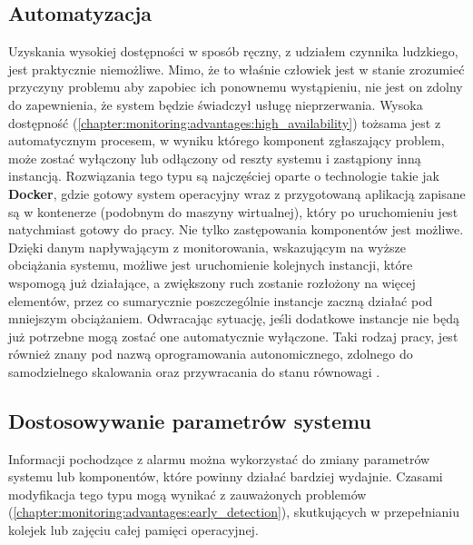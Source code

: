     \subsection{Automatyzacja}
    Uzyskania wysokiej dostępności w sposób ręczny, z udziałem czynnika ludzkiego, jest praktycznie niemożliwe.
    Mimo, że to właśnie człowiek jest w stanie zrozumieć przyczyny problemu aby zapobiec ich ponownemu wystąpieniu, 
    nie jest on zdolny do zapewnienia, że system będzie świadczył usługę nieprzerwania. Wysoka dostępność (\ref{chapter:monitoring:advantages:high_availability}) tożsama jest z automatycznym procesem, w wyniku którego
    komponent zgłaszający problem, może zostać wyłączony lub odłączony od reszty systemu i zastąpiony inną instancją.
    Rozwiązania tego typu są najczęściej oparte o technologie takie jak \textbf{Docker}, gdzie gotowy system
    operacyjny wraz z przygotowaną aplikacją zapisane są w kontenerze (podobnym do maszyny wirtualnej), który po 
    uruchomieniu jest natychmiast gotowy do pracy. Nie tylko zastępowania komponentów jest możliwe. Dzięki
    danym napływającym z monitorowania, wskazującym na wyższe obciążania systemu, możliwe jest uruchomienie
    kolejnych instancji, które wspomogą już działające, a zwiększony ruch zostanie rozłożony na więcej elementów,
    przez co sumarycznie poszczególnie instancje zaczną działać pod mniejszym obciążaniem. Odwracając sytuację, jeśli
    dodatkowe instancje nie będą już potrzebne mogą zostać one automatycznie wyłączone. Taki rodzaj pracy, jest również
    znany pod nazwą oprogramowania autonomicznego, zdolnego do samodzielnego skalowania oraz przywracania do stanu równowagi \cite{monitoring_and_alerting}.
    
    \subsection{Dostosowywanie parametrów systemu}
    Informacji pochodzące z alarmu można wykorzystać do zmiany parametrów systemu lub komponentów,
    które powinny działać bardziej wydajnie. Czasami modyfikacja tego typu mogą wynikać z zauważonych
    problemów (\ref{chapter:monitoring:advantages:early_detection}), skutkujących w przepełnianiu
    kolejek lub zajęciu całej pamięci operacyjnej. 